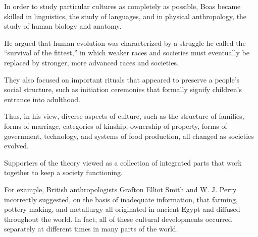 \qquad [B] In order to study particular cultures as completely as possible, Boas became skilled in linguistics, the study of languages, and in physical anthropology, the study of human biology and anatomy.

\qquad [C] He argued that human evolution was characterized by a struggle he called the ``survival of the fittest,'' in which weaker races and societies must eventually be replaced by stronger, more advanced races and societies.

\qquad [D] They also focused on important rituals that appeared to preserve a people's social structure, such as initiation ceremonies that formally signify children's entrance into adulthood.

\qquad [E] Thus, in his view, diverse aspects of culture, such as the structure of families, forms of marriage, categories of kinship, ownership of property, forms of government, technology, and systems of food production, all changed as societies evolved.

\qquad [F] Supporters of the theory viewed as a collection of integrated parts that work together to keep a society functioning.

\qquad [G] For example, British anthropologists Grafton Elliot Smith and W. J. Perry incorrectly suggested, on the basis of inadequate information, that farming, pottery making, and metallurgy all originated in ancient Egypt and diffused throughout the world. In fact, all of these cultural developments occurred separately at different times in many parts of the world.

